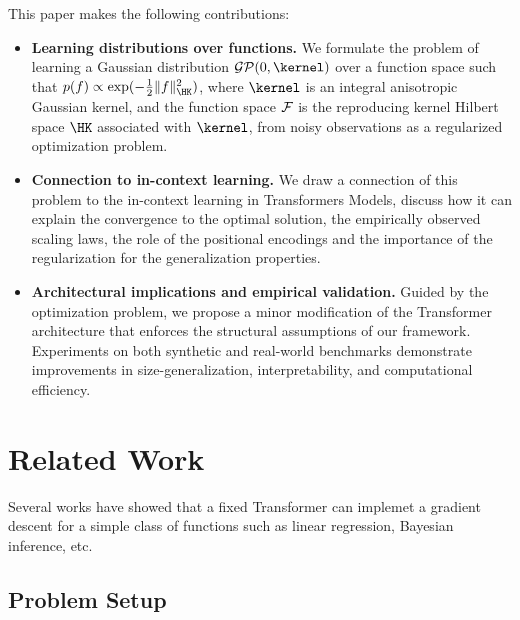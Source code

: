 \documentclass{article}
\begin{document}
This paper makes the following contributions:
\begin{itemize}
	\item \textbf{Learning distributions over functions.}
	      We formulate the problem of learning a Gaussian distribution $\mathcal{GP}(0, \kernel)$ over a function space such that $p(f) \propto \exp(-\frac{1}{2}\|f\|_{\HK}^2)$, where $\kernel$ is an integral anisotropic Gaussian kernel,
	      and the function space $\mathcal{F}$ is the reproducing kernel Hilbert space $\HK$ associated with $\kernel$, from noisy observations as a regularized optimization problem.


	\item \textbf{Connection to in-context learning.}
	      We draw a connection of this problem to the in-context learning in Transformers Models, discuss how it can explain the convergence to the optimal solution, the empirically observed scaling laws, the role of the positional encodings and the importance of the regularization for the generalization properties.

	\item \textbf{Architectural implications and empirical validation.}
	      Guided by the optimization problem, we propose a minor modification of the Transformer
	      architecture that enforces the structural assumptions of our framework.
	      Experiments on both synthetic and real-world benchmarks demonstrate improvements
	      in size-generalization, interpretability, and computational efficiency.
\end{itemize}

\newpage

\section{Related Work}

Several works have showed that a fixed Transformer can implemet a gradient descent for a simple class of functions such as linear regression, Bayesian inference, etc.

\newpage


\subsection{Problem Setup}\label{sec:set-up}
\end{document}

